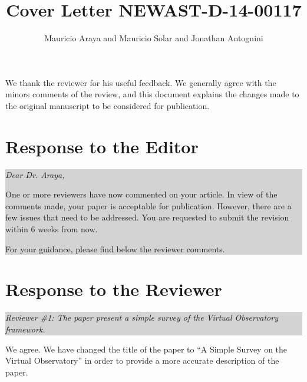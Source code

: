 \documentclass[a4paper]{article}
\title{Cover Letter NEWAST-D-14-00117}
\author{Mauricio Araya and Mauricio Solar and Jonathan Antognini}
\newcommand{\quoting}[1]{
  
  
  \colorbox{lightgray}{
    \begin{minipage}{0.98\linewidth}
      \em #1
    \end{minipage}
  }
  
  
}
\begin{document}
\maketitle


We thank the reviewer for his useful feedback. We generally agree
with the minors comments of the review, and this document 
explains the changes made to the original manuscript to be 
considered for publication.

\section{Response to the Editor}

\quoting{
Dear Dr. Araya,

One or more reviewers have now commented on your article. In view of the
comments made, your paper is acceptable for publication. However, there are a
few issues that need to be addressed.
You are requested to submit the revision within 6 weeks from now.

For your guidance, please find below the reviewer comments.
}


\section{Response to the Reviewer}

\quoting{
Reviewer \#1: The paper present a simple survey of the Virtual Observatory
framework. 
}

We agree. We have changed the title of
the paper to ``A Simple Survey on the Virtual Observatory'' in order to provide
a more accurate description of the paper.
\end{document}

